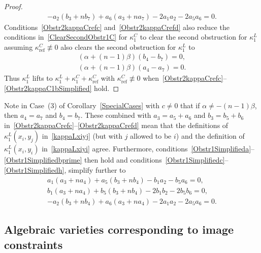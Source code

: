 \documentclass[10pt,a4paper]{amsart}
\numberwithin{equation}{section}
\DeclareMathOperator{\refl}{ref}
\begin{document}
\begin{proof}
\begin{gather}
\label{Obstr1Simplifiedh}
-a_2(b_3 + nb_7) + a_6(a_3 + na_7) - 2a_1 a_2 -2a_5 a_6=0.
\end{gather}
Conditions~\eqref{Obstr2kappaCrefc} and~\eqref{Obstr2kappaCrefd} also reduce the conditions in~\eqref{ClearSecondObstr1C} for $\kappa^C_1$ to
clear the second obstruction for $\kappa^L_1$ assuming $\kappa^C_{\refl} \not\equiv 0$
also clears the second obstruction for $\kappa^L_1$ to
\begin{gather}
\label{Obstr2kappaC1aSimplified}
(\alpha+(n-1)\beta)(b_4-b_7)=0, \\
\label{Obstr2kappaC1bSimplified}
(\alpha+(n-1)\beta)(a_4-a_7)=0.
\end{gather}
Thus
$\kappa^L_1$ lifts to $\kappa^L_1+\kappa^C_1+\kappa^C_{\refl}$ with $\kappa^C_{\refl}\not\equiv 0$
when~\eqref{Obstr2kappaCrefc}--\eqref{Obstr2kappaC1bSimplified} hold.
\end{proof}

\begin{Remark}
Note in Case~(3) of Corollary~\ref{SpecialCases} with $c \neq 0$ that if $\alpha \neq -(n-1)\beta$, then $a_4=a_7$ and $b_4=b_7$.
These combined with $a_3=a_5+a_6$ and $b_3=b_5+b_6$
in~\eqref{Obstr2kappaCrefc}--\eqref{Obstr2kappaCrefd}
mean that the definitions of $\kappa^L_1(x_i,y_j)$ in~\eqref{kappaLxiyj} (but with
$j$ allowed to be $i$) and the definition of~$\kappa^L_1(x_i,y_i)$ in~\eqref{kappaLxiyi}
agree.
Furthermore, conditions~\eqref{Obstr1Simplifieda}--\eqref{Obstr1Simplifiedbprime} then hold and
conditions~\eqref{Obstr1Simplifiedc}--\eqref{Obstr1Simplifiedh},
simplify further to
\begin{gather*}
a_1(a_3 + na_4) + a_5(b_3 + nb_4) - b_1 a_2 - b_5 a_6=0, \\
b_1(a_3 + na_4) + b_5(b_3 + nb_4)- 2b_1 b_2 - 2b_5 b_6=0, \\
-a_2(b_3 + nb_4) + a_6(a_3 + na_4) - 2a_1 a_2 - 2a_5 a_6=0.
\end{gather*}
\end{Remark}

\subsection{Algebraic varieties corresponding to image constraints}\label{algvars}
\end{document}
